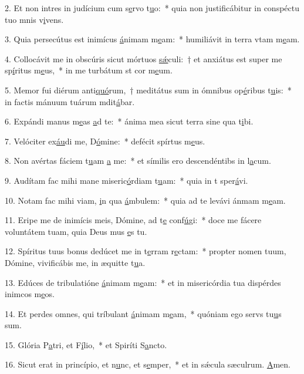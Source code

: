 2. Et non intres in judícium cum s\uline{e}rvo t\uline{u}o:~* quia non justificábitur in conspéctu tuo mnis v\uline{i}vens.\par 
3. Quia persecútus est inimícus \uline{á}nimam m\uline{e}am:~* humiliávit in terra vtam m\uline{e}am.\par 
4. Collocávit me in obscúris sicut mórtuos \uline{sǽ}culi:~† et anxiátus est super me sp\uline{í}ritus m\uline{e}us,~* in me turbátum st cor m\uline{e}um.\par 
5. Memor fui diérum anti\uline{quó}rum,~† meditátus sum in ómnibus op\uline{é}ribus t\uline{u}is:~* in factis mánuum tuárum mdit\uline{á}bar.\par 
6. Expándi manus m\uline{e}as \uline{a}d te:~* ánima mea sicut terra sine qua t\uline{i}bi.\par 
7. Velóciter ex\uline{áu}di me, D\uline{ó}mine:~* defécit spírtus m\uline{e}us.\par 
8. Non avértas fáciem t\uline{u}am \uline{a} me:~* et símilis ero descendéntibs in l\uline{a}cum.\par 
9. Audítam fac mihi mane miseric\uline{ó}rdiam t\uline{u}am:~* quia in t sper\uline{á}vi.\par 
10. Notam fac mihi viam, \uline{i}n qua \uline{á}mbulem:~* quia ad te levávi ánmam m\uline{e}am.\par 
11. Eripe me de inimícis meis, Dómine, ad t\uline{e} conf\uline{ú}gi:~* doce me fácere voluntátem tuam, quia Deus mus \uline{e}s tu.\par 
12. Spíritus tuus bonus dedúcet me in t\uline{e}rram r\uline{e}ctam:~* propter nomen tuum, Dómine, vivificábis me, in æquitte t\uline{u}a.\par 
13. Edúces de tribulatióne \uline{á}nimam m\uline{e}am:~* et in misericórdia tua dispérdes inimcos m\uline{e}os.\par 
14. Et perdes omnes, qui tríbulant \uline{á}nimam m\uline{e}am,~* quóniam ego servs tu\uline{u}s sum.\par 
15. Glória P\uline{a}tri, et F\uline{í}lio,~* et Spiríti S\uline{a}ncto.\par 
16. Sicut erat in princípio, et n\uline{u}nc, et s\uline{e}mper,~* et in sǽcula sæculrum. \uline{A}men.\par 
